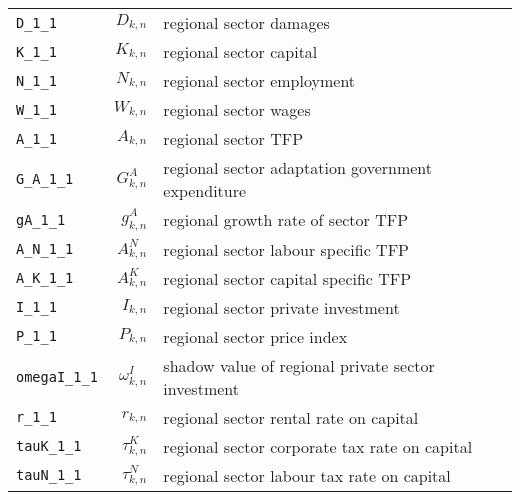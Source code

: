 \begin{center}
\begin{longtable}{lrl}
\texttt{D\_1\_1} & ${D_{k,n}}$ & regional sector damages\\
\texttt{K\_1\_1} & ${K_{k,n}}$ & regional sector capital\\
\texttt{N\_1\_1} & ${N_{k,n}}$ & regional sector employment\\
\texttt{W\_1\_1} & ${W_{k,n}}$ & regional sector wages\\
\texttt{A\_1\_1} & ${A_{k,n}}$ & regional sector TFP\\
\texttt{G\_A\_1\_1} & ${G^{A}_{k,n}}$ & regional sector adaptation government expenditure\\
\texttt{gA\_1\_1} & ${g^{A}_{k,n}}$ & regional growth rate of sector TFP\\
\texttt{A\_N\_1\_1} & ${A^{N}_{k,n}}$ & regional sector labour specific TFP\\
\texttt{A\_K\_1\_1} & ${A^{K}_{k,n}}$ & regional sector capital specific TFP\\
\texttt{I\_1\_1} & ${I_{k,n}}$ & regional sector private investment\\
\texttt{P\_1\_1} & ${P_{k,n}}$ & regional sector price index\\
\texttt{omegaI\_1\_1} & ${\omega^I_{k,n}}$ & shadow value of regional private sector investment\\
\texttt{r\_1\_1} & ${r_{k,n}}$ & regional sector rental rate on capital\\
\texttt{tauK\_1\_1} & ${\tau^{K}_{k,n}}$ & regional sector corporate tax rate on capital\\
\texttt{tauN\_1\_1} & ${\tau^{N}_{k,n}}$ & regional sector labour tax rate on capital\\
\hline%
\end{longtable}
\end{center}
